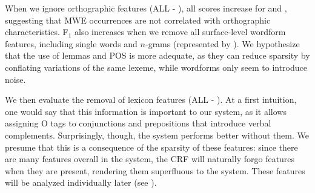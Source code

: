 \documentclass[output=paper,
modfonts
]{langscibook}
\begin{document}


When we ignore orthographic features ({\textsc ALL} - ), all scores increase for \devAQ{} and \devDD{}, suggesting that  MWE occurrences are not correlated with orthographic characteristics. F$_1$ also increases when we remove all surface-level wordform features, including single words and $n$-grams (represented by ). We hypothesize that the use of lemmas and POS is more adequate, as they can reduce sparsity by conflating variations of the same lexeme, while wordforms only seem to introduce noise.

We then evaluate the removal of lexicon features ({\textsc ALL} - ).
At a first intuition, one would say that this information is important to our system, as it allows assigning O tags to conjunctions and prepositions that introduce verbal complements. Surprisingly, though, the system performs better without them. 
We presume that this is a consequence of the sparsity of these features: since there are many features overall in the system, the CRF will naturally forgo  features when they are present, rendering them superfluous to the system. These features will be analyzed individually later (see ).
\end{document}
